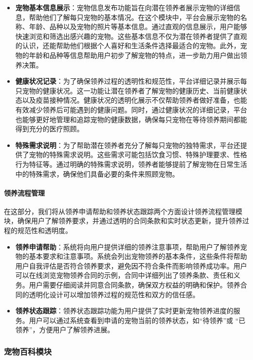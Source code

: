 \begin{itemize}
	\item \textbf{宠物基本信息展示}：宠物信息发布功能旨在向潜在领养者展示宠物的详细信息，帮助他们了解每只宠物的基本情况。在这个模块中，平台会展示宠物的名称、年龄、品种以及宠物的照片等基本信息。通过直观的信息展示，用户能够快速浏览和筛选出感兴趣的宠物。这些基本信息不仅为潜在领养者提供了直观的认识，还能帮助他们根据个人喜好和生活条件选择最适合的宠物。此外，宠物的年龄和品种等信息帮助用户初步了解宠物的特点，进一步助力用户做出领养决策。
	\item \textbf{健康状况记录}：为了确保领养过程的透明性和规范性，平台详细记录并展示每只宠物的健康状况。这一功能让潜在领养者了解宠物的健康历史、当前健康状态以及疫苗接种情况。健康状况的透明化展示不仅帮助领养者做好准备，也能有效减少领养后可能遇到的健康问题。同时，通过健康状况的详细记录，平台也能够更好地管理和追踪宠物的健康数据，确保每只宠物在等待领养期间都能得到充分的医疗照顾。
	\item \textbf{特殊需求说明}：为了帮助潜在领养者充分了解每只宠物的独特需求，平台还提供了宠物的特殊需求说明。这些需求可能包括饮食习惯、特殊护理要求、性格行为特征等。通过明确的特殊需求说明，领养者能够提前了解宠物在日常生活中的特殊需求，确保他们具备必要的条件来照顾宠物。
\end{itemize}

\paragraph{领养流程管理}

在这部分，我们将从领养申请帮助和领养状态跟踪两个方面设计领养流程管理模块，确保用户了解领养要求，并通过透明的合同条款和实时状态更新，提升领养过程的规范性和透明度。

\begin{itemize}
	\item \textbf{领养申请帮助}：系统将向用户提供详细的领养注意事项，帮助用户了解领养宠物的基本要求和注意事项。系统会列出宠物领养的基本条件，这些条件将帮助用户自我评估是否符合领养要求，避免因不符合条件而影响领养成功率。用户可以在线浏览宠物领养合同的示例，合同中详细列出了领养条款、责任和义务。用户需要仔细阅读并同意合同条款，确保双方权益的明确和保护。领养合同的透明化设计可以增加领养过程的规范性和双方的信任感。
	\item \textbf{领养状态跟踪}：领养状态跟踪功能为用户提供了实时更新宠物领养进度的服务。用户可以通过系统查看到申请的宠物当前的领养状态，如“待领养”或 “已领养”，方便用户了解领养进展。
\end{itemize}

\subsubsection{宠物百科模块}

